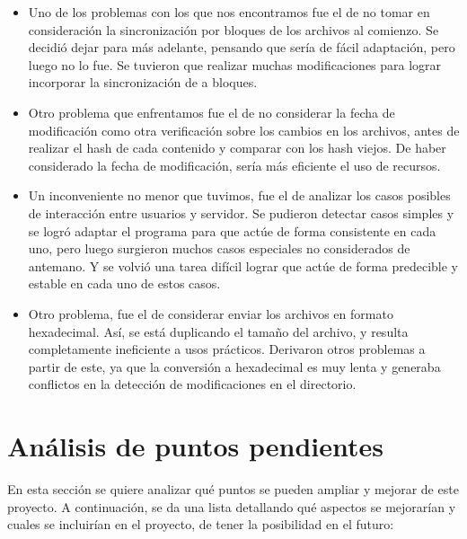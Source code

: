 \documentclass{article}
\begin{document}
\begin{itemize}
\item Uno de los problemas con los que nos encontramos fue el de no tomar en consideración la sincronización por bloques de los archivos al comienzo. Se decidió dejar para más adelante, pensando que sería de fácil adaptación, pero luego no lo fue. Se tuvieron que realizar muchas modificaciones para lograr incorporar la sincronización de a bloques.
\item Otro problema que enfrentamos fue el de no considerar la fecha de modificación como otra verificación sobre los cambios en los archivos, antes de realizar el hash de cada contenido y comparar con los hash viejos. De haber considerado la fecha de modificación, sería más eficiente el uso de recursos.
\item Un inconveniente no menor que tuvimos, fue el de analizar los casos posibles de interacción entre usuarios y servidor. Se pudieron detectar casos simples y se logró adaptar el programa para que actúe de forma consistente en cada uno, pero luego surgieron muchos casos especiales no considerados de antemano. Y se volvió una tarea difícil lograr que actúe de forma predecible y estable en cada uno de estos casos.
\item Otro problema, fue el de considerar enviar los archivos en formato hexadecimal. Así, se está duplicando el tamaño del archivo, y resulta completamente ineficiente a usos prácticos. Derivaron otros problemas a partir de este, ya que la conversión a hexadecimal es muy lenta y generaba conflictos en la detección de modificaciones en el directorio.
\end{itemize}

\bigskip




\section{Análisis de puntos pendientes}

	En esta sección se quiere analizar qué puntos se pueden ampliar y mejorar de este proyecto. A continuación, se da una lista detallando qué aspectos se mejorarían y cuales se incluirían en el proyecto, de tener la posibilidad en el futuro:
\end{document}
